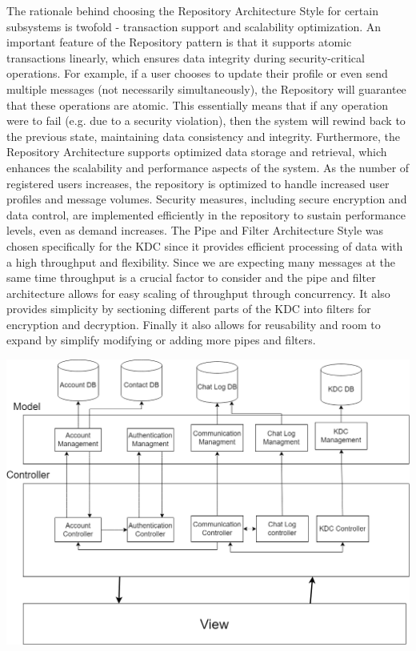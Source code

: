 \documentclass[]{article}
\begin{document}
\newline\newline
The rationale behind choosing the Repository Architecture Style for certain subsystems is twofold - transaction support and scalability optimization. An important feature of the Repository pattern is that it supports atomic transactions linearly, which ensures data integrity during security-critical operations. For example, if a user chooses to update their profile or even send multiple messages (not necessarily simultaneously), the Repository will guarantee that these operations are atomic. This essentially means that if any operation were to fail (e.g. due to a security violation), then the system will rewind back to the previous state, maintaining data consistency and integrity. Furthermore, the Repository Architecture supports optimized data storage and retrieval, which enhances the scalability and performance aspects of the system. As the number of registered users increases, the repository is optimized to handle increased user profiles and message volumes. Security measures, including secure encryption and data control, are implemented efficiently in the repository to sustain performance levels, even as demand increases.
\newline\newline
The Pipe and Filter Architecture Style was chosen specifically for the KDC since it provides efficient processing of data with a high throughput and flexibility. Since we are expecting many messages at the same time throughput is a crucial factor to consider and the pipe and filter architecture allows for easy scaling of throughput through concurrency. It also provides simplicity by sectioning different parts of the KDC into filters for encryption and decryption. Finally it also allows for reusability and room to expand by simplify modifying or adding more pipes and filters.
\newline\newline
\begin{center}
	\includegraphics[width=0.7\paperwidth]{Systemarch.png}
\end{center}
\end{document}
